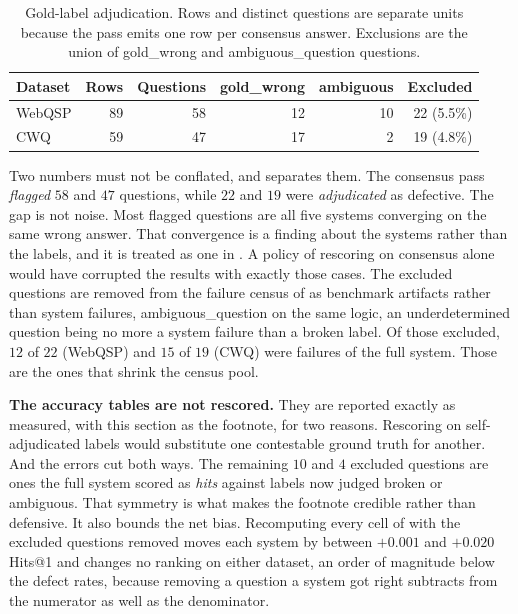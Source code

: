 \begin{table}[!tb]
  \begin{center}
    \caption[Gold-label adjudication]{Gold-label adjudication. Rows and distinct
questions are separate units because the pass emits one row per consensus
answer. Exclusions are the union of \textsf{gold\_wrong} and
\textsf{ambiguous\_question} questions.}
    \label{tab:goldnoise}
    \begin{tabular}{|l|r|r|r|r|r|}
      \hline
      \textbf{Dataset} & \textbf{Rows} & \textbf{Questions} &
      \textbf{gold\_wrong} & \textbf{ambiguous} & \textbf{Excluded} \\
      \hline
WebQSP & 89 & 58 & 12 & 10 & 22 (5.5\%) \\ CWQ & 59 & 47 & 17 & 2 & 19 (4.8\%)
\\
      \hline
    \end{tabular}
  \end{center}
\end{table}

Two numbers must not be conflated, and  separates them. The
consensus pass \emph{flagged} $58$ and $47$ questions, while $22$ and $19$ were
\emph{adjudicated} as defective. The gap is not noise. Most flagged questions
are all five systems converging on the same wrong answer. That convergence is a
finding about the systems rather than the labels, and it is treated as one in
. A policy of rescoring on consensus alone would have corrupted
the results with exactly those cases. The excluded questions are removed from
the failure census of  as benchmark artifacts rather
than system failures, \textsf{ambiguous\_question} on the same logic, an
underdetermined question being no more a system failure than a broken label. Of
those excluded, $12$ of $22$ (WebQSP) and $15$ of $19$ (CWQ) were failures of
the full system. Those are the ones that shrink the census pool.

\textbf{The accuracy tables are not rescored.} They are reported exactly as
measured, with this section as the footnote, for two reasons. Rescoring on
self-adjudicated labels would substitute one contestable ground truth for
another. And the errors cut both ways. The remaining $10$ and $4$ excluded
questions are ones the full system scored as \emph{hits} against labels now
judged broken or ambiguous. That symmetry is what makes the footnote credible
rather than defensive. It also bounds the net bias. Recomputing every cell of
 with the excluded questions removed moves each system by between
$+0.001$ and $+0.020$ Hits@1 and changes no ranking on either dataset, an order
of magnitude below the defect rates, because removing a question a system got
right subtracts from the numerator as well as the denominator.

